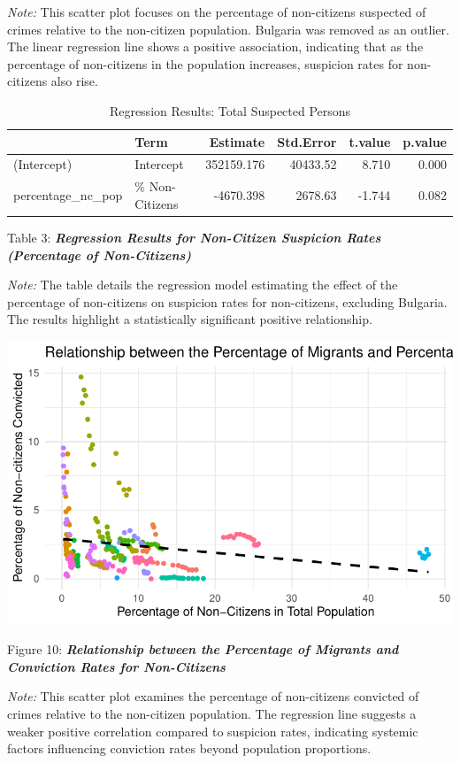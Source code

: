 \documentclass[
]{article}
\begin{document}
\emph{Note:} This scatter plot focuses on the percentage of non-citizens
suspected of crimes relative to the non-citizen population. Bulgaria was
removed as an outlier. The linear regression line shows a positive
association, indicating that as the percentage of non-citizens in the
population increases, suspicion rates for non-citizens also rise.

\begin{table}
\centering
\caption{Regression Results: Total Suspected Persons}
\centering
\begin{tabular}[t]{l|l|r|r|r|r}
\hline
  & Term & Estimate & Std.Error & t.value & p.value\\
\hline
(Intercept) & Intercept & 352159.176 & 40433.52 & 8.710 & 0.000\\
\hline
percentage\_nc\_pop & \% Non-Citizens & -4670.398 & 2678.63 & -1.744 & 0.082\\
\hline
\end{tabular}
\end{table}

Table 3: \textbf{\emph{Regression Results for Non-Citizen Suspicion
Rates (Percentage of Non-Citizens)}}

\emph{Note:} The table details the regression model estimating the
effect of the percentage of non-citizens on suspicion rates for
non-citizens, excluding Bulgaria. The results highlight a statistically
significant positive relationship.

\includegraphics{DataMan_Project_files/figure-pdf/unnamed-chunk-38-1.pdf}

Figure 10: \textbf{\emph{Relationship between the Percentage of Migrants
and Conviction Rates for Non-Citizens}}

\emph{Note:} This scatter plot examines the percentage of non-citizens
convicted of crimes relative to the non-citizen population. The
regression line suggests a weaker positive correlation compared to
suspicion rates, indicating systemic factors influencing conviction
rates beyond population proportions.
\end{document}
